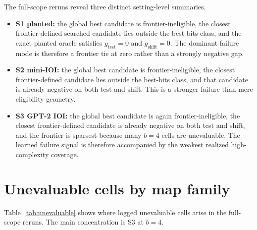 \documentclass[10pt]{article}
\newcommand{\gtest}{g_{\mathrm{test}}}
\newcommand{\gshift}{g_{\mathrm{shift}}}
\begin{document}
The full-scope reruns reveal three distinct setting-level summaries.

\begin{itemize}[leftmargin=1.5em]
\item \textbf{S1 planted:} the global best candidate is frontier-ineligible, the closest frontier-defined searched candidate lies outside the best-bits class, and the exact planted oracle satisfies $\gtest=0$ and $\gshift=0$. The dominant failure mode is therefore a frontier tie at zero rather than a strongly negative gap.
\item \textbf{S2 mini-IOI:} the global best candidate is frontier-ineligible, the closest frontier-defined candidate lies outside the best-bits class, and that candidate is already negative on both test and shift. This is a stronger failure than mere eligibility geometry.
\item \textbf{S3 GPT-2 IOI:} the global best candidate is again frontier-ineligible, the closest frontier-defined candidate is already negative on both test and shift, and the frontier is sparsest because many $b=4$ cells are unevaluable. The learned failure signal is therefore accompanied by the weakest realized high-complexity coverage.
\end{itemize}

\section{Unevaluable cells by map family}

Table~\ref{tab:unevaluable} shows where logged unevaluable cells arise in the full-scope reruns. The main concentration is S3 at $b=4$.

\begin{table}[h]
\caption{\textbf{Unevaluable cells by map family.} Counts are over the locked 120-cell pool in each setting.}
\label{tab:unevaluable}
\centering
\small

\end{table}
\end{document}
